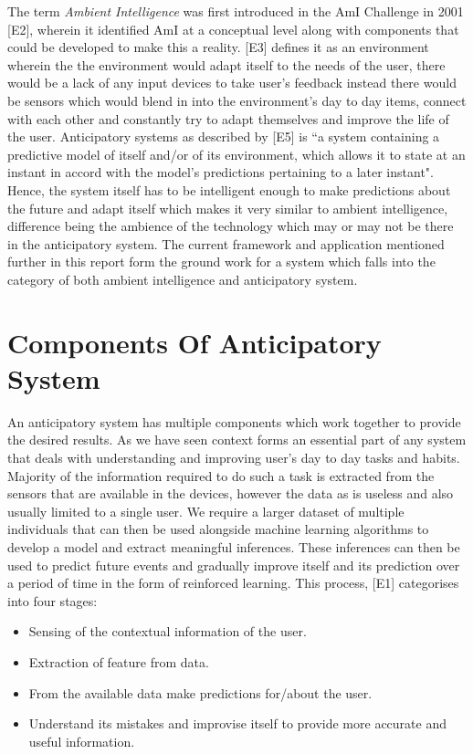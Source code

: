\documentclass[12pt]{report}
\begin{document}
The term \textit{Ambient Intelligence} was first introduced in the AmI Challenge in 2001 [E2], wherein it identified AmI at a conceptual level along with components that could be developed to make this a reality. [E3] defines it as an environment wherein the the environment would adapt itself to the needs of the user, there would be a lack of any input devices to take user's feedback instead there would be sensors which would blend in into the environment's day to day items, connect with each other and constantly try to adapt themselves and improve the life of the user. Anticipatory systems as described by [E5] is ``a system containing a predictive model of itself and/or of its environment, which allows it to state at an instant in accord with the model's predictions pertaining to a later instant". Hence, the system itself has to be intelligent enough to make predictions about the future and adapt itself which makes it very similar to ambient intelligence, difference being the ambience of the technology which may or may not be there in the anticipatory system. The current framework and application mentioned further in this report form the ground work for a system which falls into the category of both ambient intelligence and anticipatory system.

\section{Components Of Anticipatory System}
An anticipatory system has multiple components which work together to provide the desired results. As we have seen context forms an essential part of any system that deals with understanding and improving user's day to day tasks and habits. Majority of the information required to do such a task is extracted from the sensors that are available in the devices, however the data as is useless and also usually limited to a single user. We require a larger dataset of multiple individuals that can then be used alongside machine learning algorithms to develop a model and extract meaningful inferences. These inferences can then be used to predict future events and gradually improve itself and its prediction over a period of time in the form of reinforced learning. This process, [E1] categorises into four stages:

\begin{itemize}
\item Sensing of the contextual information of the user.
\item Extraction of feature from data.
\item From the available data make predictions for/about the user.
\item Understand its mistakes and improvise itself to provide more accurate and useful information.
\end{itemize}
\end{document}
